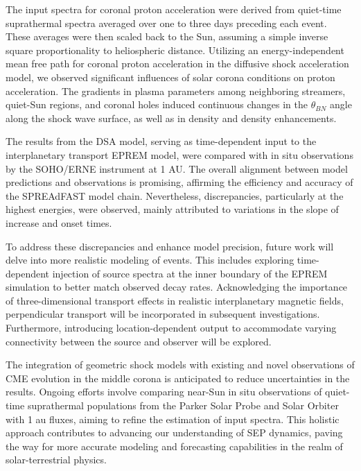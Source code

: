 The input spectra for coronal proton acceleration were derived from quiet-time suprathermal spectra averaged over one to three days preceding each event. These averages were then scaled back to the Sun, assuming a simple inverse square proportionality to heliospheric distance. Utilizing an energy-independent mean free path for coronal proton acceleration in the diffusive shock acceleration model, we observed significant influences of solar corona conditions on proton acceleration. The gradients in plasma parameters among neighboring streamers, quiet-Sun regions, and coronal holes induced continuous changes in the $\theta_{BN}$ angle along the shock wave surface, as well as in density and density enhancements.

The results from the DSA model, serving as time-dependent input to the interplanetary transport EPREM model, were compared with in situ observations by the SOHO/ERNE instrument at 1 AU. The overall alignment between model predictions and observations is promising, affirming the efficiency and accuracy of the SPREAdFAST model chain. Nevertheless, discrepancies, particularly at the highest energies, were observed, mainly attributed to variations in the slope of increase and onset times.

To address these discrepancies and enhance model precision, future work will delve into more realistic modeling of events. This includes exploring time-dependent injection of source spectra at the inner boundary of the EPREM simulation to better match observed decay rates. Acknowledging the importance of three-dimensional transport effects in realistic interplanetary magnetic fields, perpendicular transport will be incorporated in subsequent investigations. Furthermore, introducing location-dependent output to accommodate varying connectivity between the source and observer will be explored.

The integration of geometric shock models with existing and novel observations of CME evolution in the middle corona is anticipated to reduce uncertainties in the results. Ongoing efforts involve comparing near-Sun in situ observations of quiet-time suprathermal populations from the Parker Solar Probe and Solar Orbiter with 1 au fluxes, aiming to refine the estimation of input spectra. This holistic approach contributes to advancing our understanding of SEP dynamics, paving the way for more accurate modeling and forecasting capabilities in the realm of solar-terrestrial physics.

